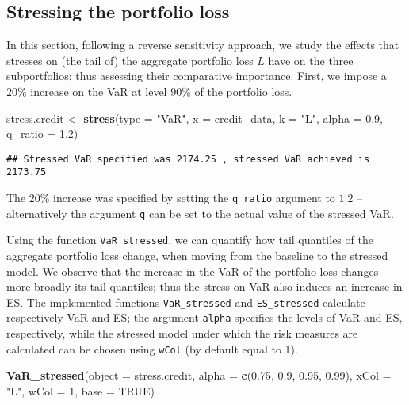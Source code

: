 \documentclass[
]{article}
\newenvironment{Shaded}{\begin{snugshade}}{\end{snugshade}}
\newcommand{\DataTypeTok}[1]{\textcolor[rgb]{0.13,0.29,0.53}{#1}}
\newcommand{\DecValTok}[1]{\textcolor[rgb]{0.00,0.00,0.81}{#1}}
\newcommand{\FloatTok}[1]{\textcolor[rgb]{0.00,0.00,0.81}{#1}}
\newcommand{\KeywordTok}[1]{\textcolor[rgb]{0.13,0.29,0.53}{\textbf{#1}}}
\newcommand{\NormalTok}[1]{#1}
\newcommand{\OtherTok}[1]{\textcolor[rgb]{0.56,0.35,0.01}{#1}}
\newcommand{\StringTok}[1]{\textcolor[rgb]{0.31,0.60,0.02}{#1}}
\begin{document}
\hypertarget{stressing-the-portfolio-loss}{%
\subsection{Stressing the portfolio loss}\label{stressing-the-portfolio-loss}}

In this section, following a reverse sensitivity approach, we study the effects that stresses on (the tail of) the aggregate portfolio loss \(L\) have on the three subportfolios; thus assessing their comparative importance. First, we impose a \(20\%\) increase on the VaR at level \(90\%\) of the portfolio loss.

\begin{Shaded}
\begin{Highlighting}[]
\NormalTok{stress.credit <-}\StringTok{ }\KeywordTok{stress}\NormalTok{(}\DataTypeTok{type =} \StringTok{"VaR"}\NormalTok{, }\DataTypeTok{x =}\NormalTok{ credit_data, }\DataTypeTok{k =} \StringTok{"L"}\NormalTok{, }\DataTypeTok{alpha =} \FloatTok{0.9}\NormalTok{, }
    \DataTypeTok{q_ratio =} \FloatTok{1.2}\NormalTok{)}
\end{Highlighting}
\end{Shaded}

\begin{verbatim}
## Stressed VaR specified was 2174.25 , stressed VaR achieved is 2173.75
\end{verbatim}

The \(20\%\) increase was specified by setting the \texttt{q\_ratio} argument to \(1.2\) -- alternatively the argument \texttt{q} can be set to the actual value of the stressed VaR.

Using the function \texttt{VaR\_stressed}, we can quantify how tail quantiles of the aggregate portfolio loss change, when moving from the baseline to the stressed model. We observe that the increase in the VaR of the portfolio loss changes more broadly its tail quantiles; thus the stress on VaR also induces an increase in ES. The implemented functions \texttt{VaR\_stressed} and \texttt{ES\_stressed} calculate respectively VaR and ES; the argument \texttt{alpha} specifies the levels of VaR and ES, respectively, while the stressed model under which the risk measures are calculated can be chosen using \texttt{wCol} (by default equal to 1).

\begin{Shaded}
\begin{Highlighting}[]
\KeywordTok{VaR_stressed}\NormalTok{(}\DataTypeTok{object =}\NormalTok{ stress.credit, }\DataTypeTok{alpha =} \KeywordTok{c}\NormalTok{(}\FloatTok{0.75}\NormalTok{, }\FloatTok{0.9}\NormalTok{, }\FloatTok{0.95}\NormalTok{, }\FloatTok{0.99}\NormalTok{), }
    \DataTypeTok{xCol =} \StringTok{"L"}\NormalTok{, }\DataTypeTok{wCol =} \DecValTok{1}\NormalTok{, }\DataTypeTok{base =} \OtherTok{TRUE}\NormalTok{)}
\end{Highlighting}
\end{Shaded}
\end{document}
